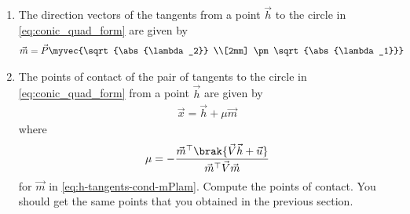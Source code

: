 \begin{enumerate}[label=\thesubsection.\arabic*.,ref=\thesubsection.\theenumi]
\item
	The direction vectors of the tangents from a point 
$\vec{h}$ to the circle in \eqref{eq:conic_quad_form} are given by  
\begin{align}
  \vec{m}&= \vec{P}\myvec{\sqrt{\abs{\lambda_2}} \\[2mm]  \pm \sqrt{\abs{\lambda_1}}}
	  \label{eq:h-tangents-cond-mPlam}
\end{align}
\item The points of contact of the pair 
of tangents 
to the circle in \eqref{eq:conic_quad_form} 
	from 
	a point $\vec{h}$ 
	are given by 
  \begin{align}
  \label{eq:line_dir_pt-lam}
	  \vec{x}  = \vec{h} + \mu \vec{m}
  \end{align}
  where 
  \begin{align}
  \label{eq:line_dir_pt-lam-mu}
	  \mu = -\frac{\vec{m}^{\top}\brak{\vec{V}\vec{h}+\vec{u}}}{\vec{m}^{\top}\vec{V}\vec{m} }
  \end{align}
	for $\vec{m}$ in 
	  \eqref{eq:h-tangents-cond-mPlam}.
  Compute the points of contact. You should get the same points that you obtained in the previous section. 
\end{enumerate}
